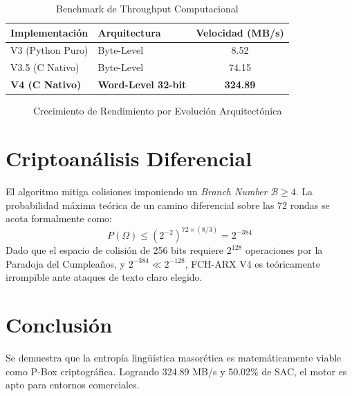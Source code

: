 \documentclass[10pt,twocolumn,letterpaper]{article}
\begin{document}
\begin{table}[h]
\centering
\caption{Benchmark de Throughput Computacional}
\label{tab:speed}
\begin{tabular}{@{}llc@{}}
\toprule
\textbf{Implementación} & \textbf{Arquitectura} & \textbf{Velocidad (MB/s)} \\ \midrule
V3 (Python Puro) & Byte-Level & 8.52 \\
V3.5 (C Nativo) & Byte-Level & 74.15 \\
\textbf{V4 (C Nativo)} & \textbf{Word-Level 32-bit} & \textbf{324.89} \\ \bottomrule
\end{tabular}
\end{table}

\begin{figure}[h]
\centering
{}
\caption{Crecimiento de Rendimiento por Evolución Arquitectónica}
\end{figure}

\section{Criptoanálisis Diferencial}

El algoritmo mitiga colisiones imponiendo un \textit{Branch Number} $\mathcal{B} \ge 4$. La probabilidad máxima teórica de un camino diferencial sobre las 72 rondas se acota formalmente como:
\begin{equation}
    P(\Omega) \leq (2^{-2})^{72 \times (8/3)} = 2^{-384}
\end{equation}
Dado que el espacio de colisión de 256 bits requiere $2^{128}$ operaciones por la Paradoja del Cumpleaños, y $2^{-384} \ll 2^{-128}$, FCH-ARX V4 es teóricamente irrompible ante ataques de texto claro elegido.

\section{Conclusión}
Se demuestra que la entropía lingüística masorética es matemáticamente viable como P-Box criptográfica. Logrando 324.89 MB/s y 50.02\% de SAC, el motor es apto para entornos comerciales.
\end{document}
